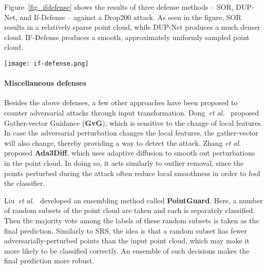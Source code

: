 \documentclass{ieeeaccess}
\def\etal{\textit{et al.}}
\begin{document}
Figure~\ref{fig_ifdefense} shows the results of three defense methods -- SOR, DUP-Net, and If-Defense -- against a Drop200 attack. As seen in the figure, SOR results in a relatively sparse point cloud, while DUP-Net produces a much denser cloud. IF-Defense produces a smooth, approximately uniformly sampled point cloud. 


\begin{figure*}
    \centering
    \texttt{[image: if-defense.png]}
    \caption{Results of three different defense methods applied on the Drop200 attack. Figure taken from~\cite{wu2020if} (Image source:~\cite{wu2020if}; use permitted under the Creative Commons Attribution License CC BY 4.0).}
    \label{fig_ifdefense}
\end{figure*}


\paragraph{Miscellaneous defenses}
\label{sec:other Defenses}
Besides the above defenses, a few other approaches have been proposed to counter adversarial attacks through input transformation. Dong~\etal~\cite{dong2020self} proposed Gather-vector Guidance (\textbf{GvG}), which is sensitive to the change of local features. In case the adversarial perturbation changes the local features, the gather-vector will also change, thereby providing a way to detect the attack. %
Zhang \etal~\cite{zhang2022ada3diff} proposed \textbf{Ada3Diff}, which uses adaptive diffusion to smooth out perturbations in the point cloud. In doing so, it acts similarly to outlier removal, since the points perturbed during the attack often reduce local smoothness in order to fool the classifier. %


Liu~\etal~\cite{liu2021pointguard} developed an ensembling method called \textbf{PointGuard}. Here, a number of random subsets of the point cloud are taken and each is separately classified. Then %
the majority vote among the labels of these random subsets is taken as the final prediction. Similarly to SRS, the idea is that a random subset has fewer adversarially-perturbed points than the input point cloud, which may make it more likely to be classified correctly. An ensemble of such decisions makes the final prediction more robust.
\end{document}
